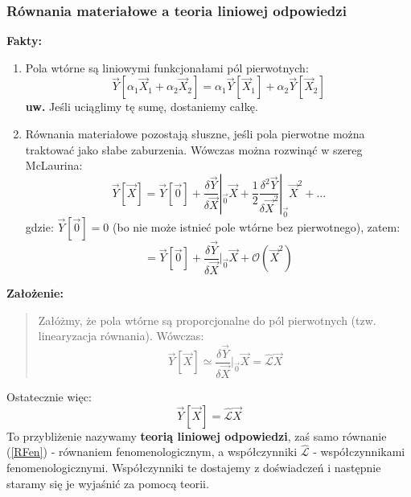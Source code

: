 \subsubsection{Równania materiałowe a teoria liniowej odpowiedzi}
\textbf{Fakty:}
\begin{enumerate}
\item Pola wtórne są liniowymi funkcjonałami pól pierwotnych:
\begin{equation} \vec{Y}[\alpha_1\vec{X}_1 + \alpha_2\vec{X}_2]=\alpha_1 \vec{Y}[\vec{X}_1] + \alpha_2 \vec{Y}[\vec{X}_2] \end{equation}
\textbf{uw.} Jeśli uciąglimy tę sumę, dostaniemy całkę.
\item Równania materiałowe pozostają słuszne, jeśli pola pierwotne można traktować jako słabe zaburzenia. Wówczas można rozwinąć w szereg McLaurina:
\begin{equation}\vec{Y}[\vec{X}]=\vec{Y}[\vec{0}]+ \frac{\delta\vec{Y}}{\delta\vec{X}}|_{\vec{0}}\vec{X} + \frac{1}{2}\frac{\delta^2 \vec{Y}}{\delta\vec{X}^2}|_{\vec{0}}\vec{X}^2 + ...\end{equation}
gdzie: $\vec{Y}[\vec{0}]=0$ (bo nie może istnieć pole wtórne bez pierwotnego), zatem:
\begin{equation}[\vec{X}]=\vec{Y}[\vec{0}]+ \frac{\delta\vec{Y}}{\delta\vec{X}}|_{\vec{0}}\vec{X} + \mathcal{O}(\vec{X}^2)\end{equation}
\end{enumerate}
\textbf{Założenie:}\begin{verse} 
Załóżmy, że pola wtórne są proporcjonalne do pól pierwotnych (tzw. linearyzacja równania). Wówczas:
\begin{equation}\vec{Y}[{\vec{X}}] \simeq \frac{\delta\vec{Y}}{\delta\vec{X}}|_{\vec{0}} \vec{X} = \hat{\mathcal{L}}\vec{X}\end{equation} \end{verse}
Ostatecznie więc:
\begin{equation}\vec{Y}[{\vec{X}}] = \hat{\mathcal{L}}\vec{X} \label{RFen} \end{equation}
To przybliżenie nazywamy \textbf{teorią liniowej odpowiedzi}, zaś samo równanie (\ref{RFen}) - równaniem fenomenologicznym, a współczynniki $\hat{\mathcal{L}}$ - współczynnikami fenomenologicznymi. Współczynniki te dostajemy z doświadczeń i następnie staramy się je wyjaśnić za pomocą teorii.

